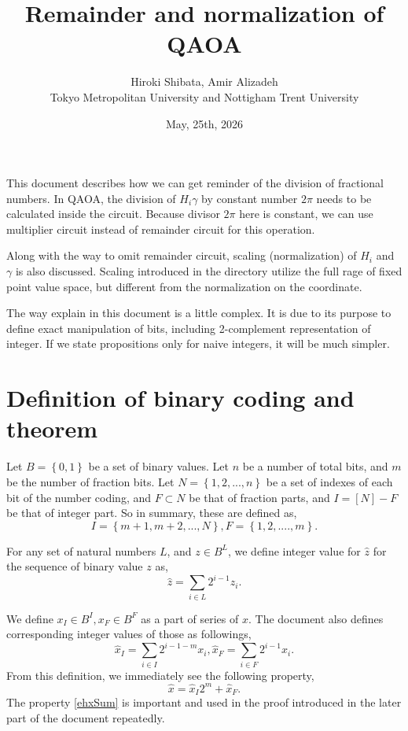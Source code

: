 \documentclass[a4paper]{article}
\title{Remainder and normalization of QAOA}
\date{May, 25th, 2026}
\author{Hiroki Shibata, Amir Alizadeh\\Tokyo Metropolitan University and Nottigham Trent University}
\newcommand{\eqlabel}[1]{\label{#1}
}
\newcommand{\cbr}[1]{\left\{#1\right\}}
\newcommand{\hx}{{\hat{x}}}
\newcommand{\hz}{{\hat{z}}}
\begin{document}
\maketitle
This document describes how we can get reminder of the division of fractional numbers. In QAOA, the division of \(H_i\gamma\) by constant number \(2 \pi\) needs to be calculated inside the circuit. Because divisor \(2\pi\) here is constant, we can use multiplier circuit instead of remainder circuit for this operation. 

Along with the way to omit remainder circuit, scaling (normalization) of \(H_i\) and \(\gamma\) is also discussed. Scaling introduced in the directory utilize the full rage of fixed point value space, but different from the normalization on the coordinate.

The way explain in this document is a little complex. It is due to its purpose to define exact manipulation of bits, including 2-complement representation of integer. If we state propositions only for naive integers, it will be much simpler. 

\section{Definition of binary coding and theorem}
Let \(B = \cbr{0, 1}\) be a set of binary values. Let \(n\) be a number of total bits, and \(m\) be the number of fraction bits. Let \(N = \cbr{1, 2, ..., n}\) be a set of indexes of each bit of the number coding, and \(F\subset N\) be that of fraction parts, and \(I  = [N] - F\)  be that of integer part. So in summary, these are defined as,
\begin{equation}
    \eqlabel{eIF}
    I = \cbr{m+1, m+2, ..., N}, F = \cbr{1, 2, ...., m}.
\end{equation}

For any set of natural numbers \(L\), and \(z\in B^L\), we define integer value for \(\hat{z}\) for the sequence of binary value \(z\) as,
\begin{equation}
    \eqlabel{eB2I}
    \hz = \sum_{i\in L} 2^{i-1} z_i.
\end{equation}

We define \(x_I\in B^I, x_F\in B^F\) as a part of series of \(x\). The document also defines corresponding integer values of those as followings,
\begin{equation}
    \eqlabel{eDefxIxF}
    \hx_I = \sum_{i\in I}2^{i-1-m} x_i, \hx_F = \sum_{i\in F}2^{i-1} x_i.
\end{equation}
From this definition, we immediately see the following property,
\begin{equation}
    \eqlabel{ehxSum}
    \hx = \hx_I 2^m + \hx_F.
\end{equation}
The property \eqref{ehxSum} is important and used in the proof introduced in the later part of the document repeatedly.
\end{document}
